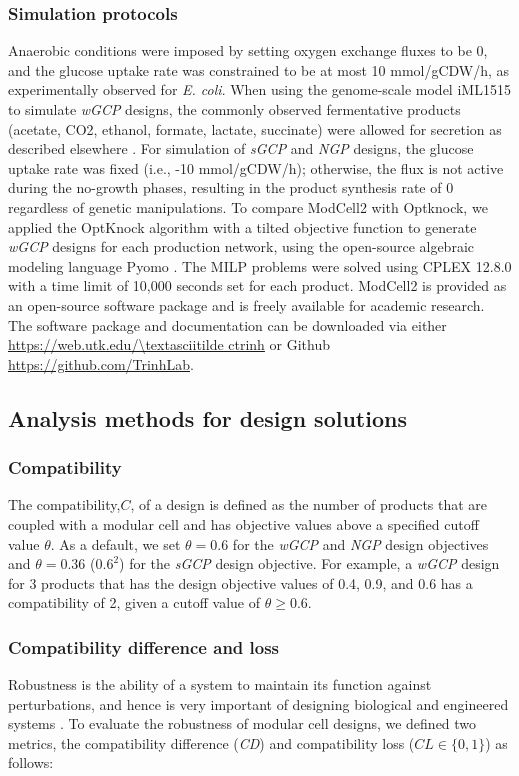 \subsubsection{Simulation protocols} Anaerobic conditions were imposed
by setting oxygen exchange fluxes to be 0, and the glucose uptake rate
was constrained to be at most 10 mmol/gCDW/h, as experimentally observed
for \emph{E. coli}. When using the genome-scale model iML1515 to
simulate \emph{wGCP} designs, the commonly observed fermentative
products (acetate, CO2, ethanol, formate, lactate, succinate) were
allowed for secretion as described elsewhere
\citep{von2017}. For simulation of \emph{sGCP} and
\emph{NGP} designs, the glucose uptake rate was fixed (i.e., -10
mmol/gCDW/h); otherwise, the flux is not active during the no-growth
phases, resulting in the product synthesis rate of 0 regardless of
genetic manipulations. To compare ModCell2 with Optknock, we applied the
OptKnock algorithm with a tilted objective function
\citep{maranas2016} to generate \emph{wGCP} designs for each
production network, using the open-source algebraic modeling language
Pyomo \citep{hart2012}. The MILP problems were solved using
CPLEX 12.8.0 with a time limit of 10,000 seconds set for each product.
ModCell2 is provided as an open-source software package and is freely
available for academic research. The software package and documentation
can be downloaded via either \url{https://web.utk.edu/\textasciitilde ctrinh} or Github
\url{https://github.com/TrinhLab}.

\subsection{Analysis methods for design
solutions}

\subsubsection{Compatibility}
The compatibility,$C$, %
of a design is defined as the number of
products that are coupled with a modular cell and has objective values
above a specified cutoff value $\theta$. As a default, we set
$\theta=0.6$ for the \emph{wGCP} and \emph{NGP} design objectives and
$\theta=0.36$ ($0.6^2$) for the \emph{sGCP}
design objective. For example, a \emph{wGCP} design for 3 products that
has the design objective values of 0.4, 0.9, and 0.6 has a compatibility
of 2, given a cutoff value of $\theta \ge 0.6$.

\subsubsection{Compatibility difference and loss} Robustness is the
ability of a system to maintain its function against perturbations, and
hence is very important of designing biological and engineered systems
\citep{kitano2004}. To evaluate the robustness of modular cell
designs, we defined two metrics, the compatibility difference
(\emph{CD}) and compatibility loss ($CL \in \{0,1\}$) as follows:

